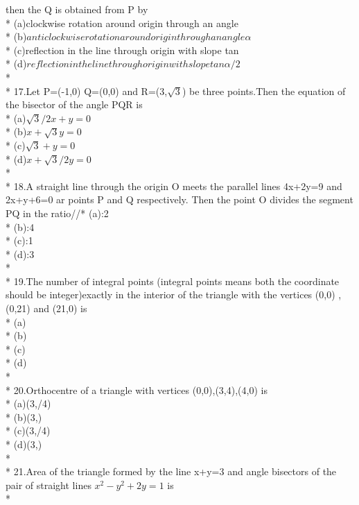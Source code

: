 \documentclass{article}
\begin{document}
then the Q is obtained from P by\\*
(a)\enspace clockwise rotation around origin through an angle \alpha\\*
(b)\enspace $anticlockwise rotation around origin through an angle \alpha$\\*
(c)\enspace reflection in the line through origin with slope tan\alpha\\*
(d)\enspace $reflection in the line through origin with slope tan\alpha/2$\\*\\*
17.\enspace Let P=(-1,0) Q=(0,0) and R=(3,$\sqrt3$) be three points.Then the equation of the bisector of the angle PQR is\\*
(a)\enspace $\sqrt3/2x+y=0$\\*
(b)\enspace $x+\sqrt3y=0$\\*
(c)\enspace $\sqrt3+y=0$\\*
(d)\enspace $x+\sqrt3/2y=0$\\*\\*
18.\enspace A straight line through the origin O meets the parallel lines 4x+2y=9 and 2x+y+6=0 ar points P and Q respectively. Then the point O divides the segment PQ in the ratio//*
(a):2\\*
(b):4\\*
(c):1\\*
(d):3\\*\\*
19.\enspace The number of integral points (integral points means both the coordinate should be integer)exactly in the interior of the triangle with the vertices (0,0) ,(0,21) and (21,0) is \\*
(a)\\*
(b)\\*
(c)\\*
(d)\\*\\*
20.\enspace Orthocentre of a triangle with vertices (0,0),(3,4),(4,0) is\\*
(a)\enspace(3,/4)\\*
(b)\enspace(3,)\\*
(c)\enspace(3,/4)\\*
(d)\enspace(3,)\\*\\*
21.\enspace Area of the triangle formed by the line x+y=3 and angle bisectors of the pair of straight lines $x^2-y^2+2y=1$ is \\*
\end{document}
